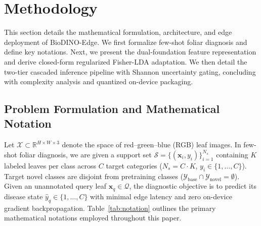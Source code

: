 \documentclass[preprint,12pt]{elsarticle}
\begin{document}
\section{Methodology}
\label{sec:methodology}
This section details the mathematical formulation, architecture, and edge deployment of BioDINO-Edge. We first formalize few-shot foliar diagnosis and define key notations. Next, we present the dual-foundation feature representation and derive closed-form regularized Fisher-LDA adaptation. We then detail the two-tier cascaded inference pipeline with Shannon uncertainty gating, concluding with complexity analysis and quantized on-device packaging.

\subsection{Problem Formulation and Mathematical Notation}
\label{sec:notation}
Let $\mathcal{X} \subset \mathbb{R}^{H \times W \times 3}$ denote the space of red--green--blue (RGB) leaf images. In few-shot foliar diagnosis, we are given a support set $\mathcal{S} = \{(\mathbf{x}_i, y_i)\}_{i=1}^{N_s}$ containing $K$ labeled leaves per class across $C$ target categories ($N_s = C \cdot K$, $y_i \in \{1, \dots, C\}$). Target novel classes are disjoint from pretraining classes ($\mathcal{Y}_{\text{base}} \cap \mathcal{Y}_{\text{novel}} = \emptyset$). Given an unannotated query leaf $\mathbf{x}_q \in \mathcal{Q}$, the diagnostic objective is to predict its disease state $\hat{y}_q \in \{1, \dots, C\}$ with minimal edge latency and zero on-device gradient backpropagation. Table~\ref{tab:notation} outlines the primary mathematical notations employed throughout this paper.
\end{document}
